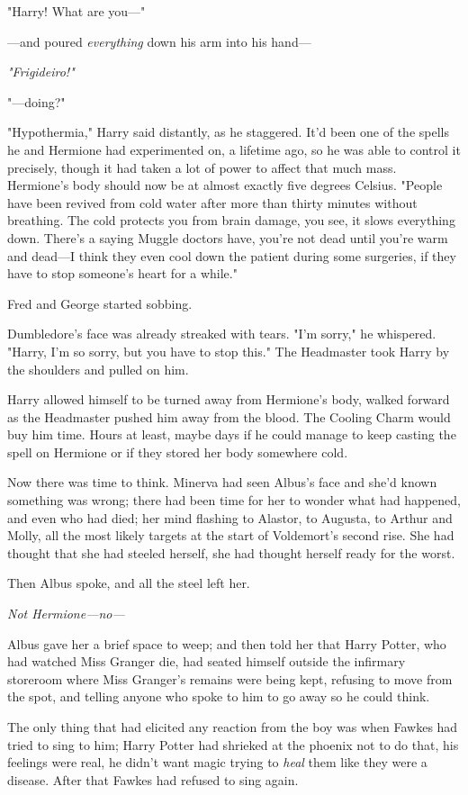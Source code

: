 "Harry! What are you---"

---and poured \emph{everything} down his arm into his hand---

\emph{"Frigideiro!"}

"---doing?"

"Hypothermia," Harry said distantly, as he staggered. It'd been one of the spells he and Hermione had experimented on, a lifetime ago, so he was able to control it precisely, though it had taken a lot of power to affect that much mass. Hermione's body should now be at almost exactly five degrees Celsius. "People have been revived from cold water after more than thirty minutes without breathing. The cold protects you from brain damage, you see, it slows everything down. There's a saying Muggle doctors have, you're not dead until you're warm and dead---I think they even cool down the patient during some surgeries, if they have to stop someone's heart for a while."

Fred and George started sobbing.

Dumbledore's face was already streaked with tears. "I'm sorry," he whispered. "Harry, I'm so sorry, but you have to stop this." The Headmaster took Harry by the shoulders and pulled on him.

Harry allowed himself to be turned away from Hermione's body, walked forward as the Headmaster pushed him away from the blood. The Cooling Charm would buy him time. Hours at least, maybe days if he could manage to keep casting the spell on Hermione or if they stored her body somewhere cold.

Now there was time to think.
\sbreak
Minerva had seen Albus's face and she'd known something was wrong; there had been time for her to wonder what had happened, and even who had died; her mind flashing to Alastor, to Augusta, to Arthur and Molly, all the most likely targets at the start of Voldemort's second rise. She had thought that she had steeled herself, she had thought herself ready for the worst.

Then Albus spoke, and all the steel left her.

\emph{Not Hermione---no---}

Albus gave her a brief space to weep; and then told her that Harry Potter, who had watched Miss Granger die, had seated himself outside the infirmary storeroom where Miss Granger's remains were being kept, refusing to move from the spot, and telling anyone who spoke to him to go away so he could think.

The only thing that had elicited any reaction from the boy was when Fawkes had tried to sing to him; Harry Potter had shrieked at the phoenix not to do that, his feelings were real, he didn't want magic trying to \emph{heal} them like they were a disease. After that Fawkes had refused to sing again.

